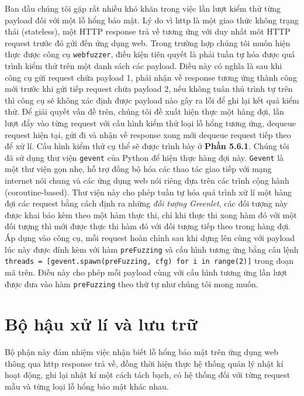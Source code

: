 Ban đầu chúng tôi gặp rất nhiều khó khăn trong việc lần lượt kiểm thử từng payload đối với một lỗ hổng bảo mật. Lý do vì \acrshort{http} là một giao thức không trạng thái (stateless), một HTTP response trả về tương ứng với duy nhất môt HTTP request trước đó gửi đến ứng dụng web. Trong trường hợp chúng tôi muốn hiện thực được công cụ \texttt{webfuzzer}, điều kiện tiên quyết là phải tuần tự hóa được quá trình kiểm thử trên một danh sách các payload. Điều này có nghĩa là sau khi công cụ gửi request chứa payload 1, phải nhận về response tương ứng thành công mới trước khi gửi tiếp request chứa payload 2, nếu không tuân thủ trình tự trên thì công cụ sẽ không xác định được payload nào gây ra lỗi để ghi lại kết quả kiểm thử. Để giải quyết vấn đề trên, chúng tôi đề xuất hiện thực một hàng đợi, lần lượt đẩy vào từng request với cấu hình kiểm thử loại lỗ hổng tương ứng, dequeue request hiện tại, gửi đi và nhận về response xong mới dequeue request tiếp theo để xử lí. Cấu hình kiểm thử cụ thể sẽ được trình bày ở \textbf{Phần 5.6.1}. Chúng tôi đã sử dụng thư viện \texttt{gevent} của Python để hiện thực hàng đợi này. \texttt{Gevent} là một thư viện gọn nhẹ, hỗ trợ đồng bộ hóa các thao tác giao tiếp với mạng internet nói chung và các ứng dụng web nói riêng dựa trên các trình cộng hành (coroutine-based). Thư viện này cho phép tuần tự hóa quá trình xử lí một hàng đợi các request bằng cách định ra những \textit{đối tượng Greenlet}, các đối tượng này được khai báo kèm theo một hàm thực thi, chỉ khi thực thi xong hàm đó với một đối tượng thì mới được thực thi hàm đó với đối tượng tiếp theo trong hàng đợi. Áp dụng vào công cụ, mỗi request hoàn chỉnh sau khi dựng lên cùng với payload lúc này được đính kèm với hàm \texttt{preFuzzing} và cấu hình tương ứng bằng câu lệnh \\\texttt{threads = [gevent.spawn(preFuzzing, cfg) for i in range(2)]} trong đoạn mã trên. Điều này cho phép mỗi payload cùng với cấu hình tương ứng lần lượt được đưa vào hàm \texttt{preFuzzing} theo thứ tự như chúng tôi mong muốn.

\section{Bộ hậu xử lí và lưu trữ}
Bộ phận này đảm nhiệm việc nhận biết lỗ hổng bảo mật trên ứng dụng web thông qua \acrshort{http} response trả về, đồng thời hiện thực hệ thống quản lý nhật kí hoạt động, ghi lại nhật kí một cách tách bạch, có hệ thống đối với từng request mẫu và từng loại lỗ hổng bảo mật khác nhau.

